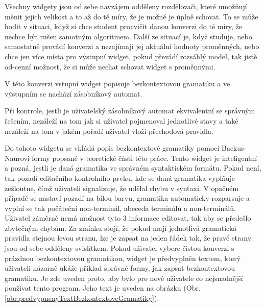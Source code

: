 Všechny widgety jsou od sebe navzájem odděleny rozdělovači, které umožňují měnit jejich velikost a to až do té míry, že je možné je úplně schovat. To se může hodit v situaci, když si chce student procvičit danou konverzi do té míry, že nechce být rušen samotným algoritmem. Další ze situací je, když studuje, nebo samostatně provádí konverzi a nezajímají jej aktuální hodnoty proměnných, nebo chce jen více místa pro výstupní widget, pokud převádí rozsáhlý model, tak jistě od-cenní možnost, že si může nechat schovat widget s proměnnými.

V této konverzi vstupní widget popisuje bezkontextovou gramatiku a ve výstupním se nachází zásobníkový automat.

Při kontrole, jestli je uživatelský zásobníkový automat ekvivalentní se správným řešením, nezáleží na tom jak si uživatel pojmenoval jednotlivé stavy a také nezáleží na tom v jakém pořadí uživatel vloží přechodová pravidla.


\zadani


Do tohoto widgetu se vkládá popis bezkontextové gramatiky pomocí Backus-Naurovi formy popsané v teoretické části této práce. Tento widget je inteligentní a pozná, jestli je daná gramatika ve správném syntaktickém formátu. Pokud není, tak pozadí editačního kontrolního prvku, kde se daná gramatika vyplňuje zežloutne, čímž uživateli signalizuje, že udělal chybu v syntaxi. V opačném případě se nastaví pozadí na bílou barvu, gramatika automaticky rozparsuje a vyplní se tak počáteční non-terminál, abeceda terminálů a non-terminálů. Uživatel záměrně nemá možnost tyto 3 informace editovat, tak aby se předešlo zbytečným chybám. Za zmínku stojí, že pokud mají jednotlivá gramatická pravidla stejnou levou stranu, lze je zapsat na jeden řádek tak, že pravé strany jsou od sebe odděleny svislítkem. Pokud uživatel vybere čistou konverzi s prázdnou bezkontextovou gramatikou, widget je předvyplněn textem, který uživateli názorně ukáže příklad správné formy, jak zapsat bezkontextovou gramatiku. Je zde uveden proto, aby bylo pro nové uživatele co nejsnadnější používat tento program. Jeho text je uveden na obrázku (Obr. \ref{obr:predvypnenyTextBezkontextoveGramatiky}). 

